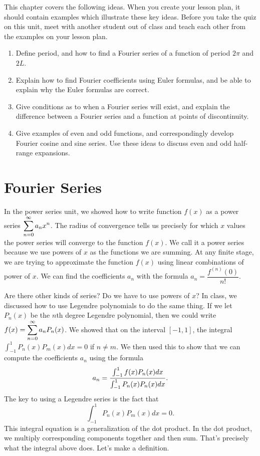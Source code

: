 

This chapter covers the following ideas. When you create your lesson plan, it should contain examples which illustrate these key ideas. Before you take the quiz on this unit, meet with another student out of class and teach each other from the examples on your lesson plan. 

\begin{enumerate}
\item Define period, and how to find a Fourier series of a function of period $2\pi$ and $2L$. 
\item Explain how to find Fourier coefficients using Euler formulas, and be able to explain why the Euler formulas are correct.
\item Give conditions as to when a Fourier series will exist, and explain the difference between a Fourier series and a function at points of discontinuity.
\item Give examples of even and odd functions, and correspondingly develop Fourier cosine and sine series.  Use these ideas to discuss even and odd half-range expansions.
\end{enumerate}



\section{Fourier Series}

In the power series unit, we showed how to write function $f(x)$ as a power series $\displaystyle\sum_{n=0}^{\infty}a_n x^n$. The radius of convergence tells us precisely for which $x$ values the power series will converge to the function $f(x)$. We call it a power series because we use powers of $x$ as the functions we are summing. At any finite stage, we are trying to approximate the function $f(x)$ using linear combinations of power of $x$. We can find the coefficients $a_n$ with the  formula $a_n=\dfrac{f^(n)(0)}{n!}$.  

Are there other kinds of series? Do we have to use powers of $x$?  
In class, we discussed how to use Legendre polynomials to do the same thing.  
If we let $P_n(x)$ be the $n$th degree Legendre polynomial, then we could write $\displaystyle f(x)=\sum_{n=0}^\infty a_n P_n(x)$. 
We showed that on the interval $[-1,1]$, the integral $\int_{-1}^1 P_n(x)P_m(x)dx=0$ if $n\neq m$.  We then used this to show that we can compute the coefficients $a_n$ using the formula 
$$\displaystyle a_n = \frac{\int_{-1}^1 f(x)P_n(x)dx}{\int_{-1}^1 P_n(x)P_n(x)dx}.$$ 
The key to using a Legendre series is the fact that $$\int_{-1}^1 P_n(x)P_m(x)dx=0.$$ 
This integral equation is a generalization of the dot product.  In the dot product, we multiply corresponding components together and then sum.  That's precisely what the integral above does.  Let's make a definition.


